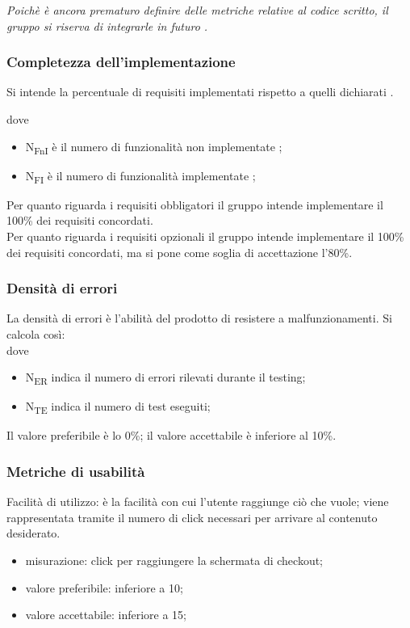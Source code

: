\documentclass[../piano_di_qualifica.tex]{subfiles}
\begin{document}
\emph{Poichè è ancora prematuro definire delle metriche relative al codice scritto, il gruppo si riserva di integrarle in futuro .}

\subsubsection{Completezza dell'implementazione}
Si intende la percentuale di requisiti implementati rispetto a quelli dichiarati .

dove
\begin{itemize}
\item N\textsubscript{FnI} è il numero di funzionalità non implementate ;
\item N\textsubscript{FI} è il numero di funzionalità implementate ;
\end{itemize}

Per quanto riguarda i requisiti obbligatori il gruppo intende implementare il 100\% dei requisiti concordati. \\
Per quanto riguarda i requisiti opzionali il gruppo intende implementare il 100\% dei requisiti concordati, ma si pone come soglia di accettazione l’80\%. 

\subsubsection{Densità di errori}
La densità di errori è l'abilità del prodotto di resistere a malfunzionamenti. Si calcola così:\\


dove
\begin{itemize}
\item N\textsubscript{ER} indica il numero di errori rilevati durante il testing;
\item N\textsubscript{TE} indica il numero di test eseguiti;
\end{itemize}

Il valore preferibile è lo 0\%; il valore accettabile è inferiore al 10\%.

\subsubsection{Metriche di usabilità}
Facilità di utilizzo: è la facilità con cui l’utente raggiunge ciò che vuole; viene rappresentata tramite il numero di click necessari per arrivare al contenuto desiderato.\\
\begin{itemize}
\item misurazione: click per raggiungere la schermata di checkout;
\item valore preferibile: inferiore a 10;
\item valore accettabile: inferiore a 15;
\end{itemize}
\end{document}
